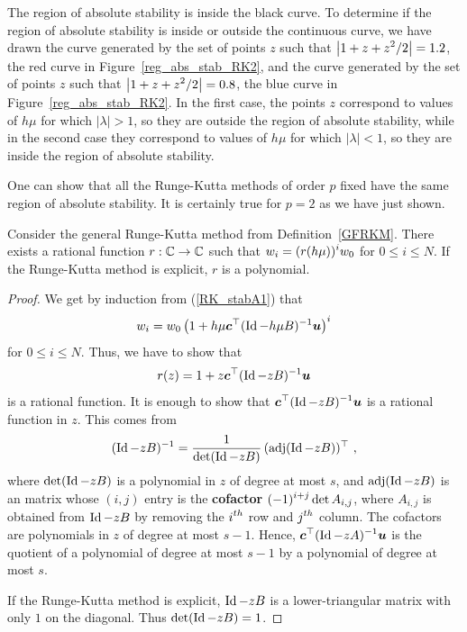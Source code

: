 \begin{egg}
The region of absolute stability is inside the black curve.
To determine if the region of absolute stability is inside or outside
the continuous curve, we have drawn the curve generated
by the set of points $z$ such that
$\displaystyle \left| 1 + z + z^2/2 \right| = 1.2$, the red curve in
Figure~\ref{reg_abs_stab_RK2}, and the curve generated by the set of
points $z$ such that
$\displaystyle \left| 1 + z + z^2/2 \right| = 0.8$, the blue
curve in Figure~\ref{reg_abs_stab_RK2}.  In the first case, the points
$z$ correspond to values of $h\mu$ for which
$| \lambda | > 1$, so they are outside the region of absolute
stability, while in the second case they correspond to values 
of $h\mu$ for which $| \lambda | < 1$, so they are inside the
region of absolute stability.

One can show that all the Runge-Kutta methods of order $p$ fixed
have the same region of absolute stability.  It is certainly true for
$p=2$ as we have just shown.
\end{egg}


\begin{prop}
Consider the general Runge-Kutta method from Definition~\ref{GFRKM}.
There exists a rational function $r:\mathbb{C} \to \mathbb{C}$ such that
$\displaystyle w_i = (r(h\mu))^i w_0$ for $0 \leq i \leq N$.
If the Runge-Kutta method is explicit, $r$ is a polynomial.
\label{rat_funct}
\end{prop}

\begin{proof}
We get by induction from (\ref{RK_stabA1}) that
\[
w_i = w_0\left(1 + h\mu \bm{c}^\top(\operatorname{Id}-h\mu B)^{-1}\bm{u} \right)^i
\]
for $0\leq i \leq N$.  Thus, we have to show that
\[
r(z) = 1 + z\bm{c}^\top (\operatorname{Id} - zB)^{-1} \bm{u}
\]
is a rational function.
It is enough to show that $\displaystyle \bm{c}^\top(\operatorname{Id}-zB)^{-1}\bm{u}$ is a
rational function in $z$.  This comes from
\[
(\operatorname{Id}-zB)^{-1} = \frac{1}{\det(\operatorname{Id}-zB)}\,(\text{adj}(\operatorname{Id}-zB))^\top \ ,
\]
where $\det(\operatorname{Id}-zB)$ is a polynomial in $z$ of degree at most $s$, and
$\text{adj}(\operatorname{Id}-zB)$ is an  matrix whose $(i,j)$ entry is
the {\bfseries cofactor} $\displaystyle (-1)^{i+j} \det A_{i,j}$,
where $A_{i,j}$ is obtained from $\operatorname{Id} - zB$ by removing the
$\displaystyle i^{th}$ row and $\displaystyle j^{th}$ column.
The cofactors are polynomials in $z$ of degree at most $s-1$.
Hence, $\displaystyle \bm{c}^\top(\operatorname{Id}-zA)^{-1}\bm{u}$ is the quotient
of a polynomial of degree at most $s-1$ by a polynomial of degree at
most $s$.

If the Runge-Kutta method is explicit, $\operatorname{Id}-zB$ is a lower-triangular
matrix with only $1$ on the diagonal.  Thus $\det(\operatorname{Id}-zB) =1$.
\end{proof}

